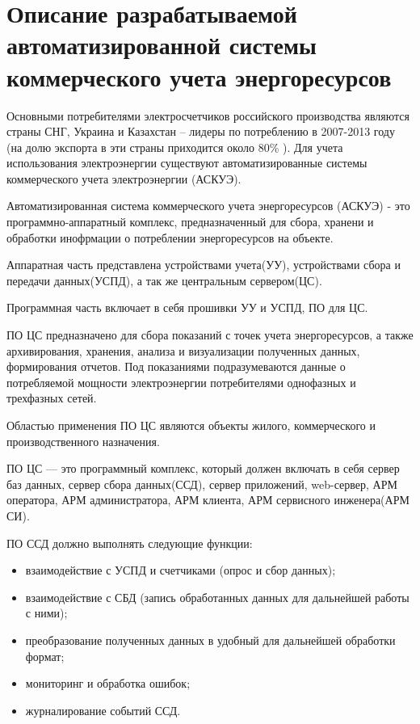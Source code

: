\newpage
\section{Описание разрабатываемой автоматизированной системы коммерческого учета энергоресурсов}
\setcounter{figure}{0}

Основными  потребителями  электросчетчиков российского производства являются страны СНГ, Украина и Казахстан – лидеры по потреблению в 2007-2013 году (на долю экспорта в эти страны приходится около  80\% \cite{rbk} ). Для учета использования электроэнергии существуют автоматизированные системы коммерческого учета электроэнергии (АСКУЭ).

Автоматизированная система коммерческого учета энергоресурсов (АСКУЭ) - это программно-аппаратный комплекс, предназначенный для сбора, хранени и обработки инофрмации о потреблении энергоресурсов на объекте. 

Аппаратная часть представлена устройствами учета(УУ), устройствами сбора и передачи данных(УСПД), а так же центральным сервером(ЦС).

Программная часть включает в себя прошивки УУ и УСПД, ПО для ЦС.

ПО ЦС предназначено для сбора показаний с точек учета энергоресурсов, а также архивирования, хранения, анализа и визуализации полученных данных, формирования отчетов. Под показаниями подразумеваются данные о потребляемой мощности электроэнергии потребителями однофазных и трехфазных сетей.

Областью применения ПО ЦС являются объекты жилого, коммерческого и производственного назначения.

ПО ЦС — это программный комплекс, который должен включать в себя сервер баз данных, сервер сбора данных(ССД), сервер приложений, web-сервер, АРМ оператора, АРМ администратора, АРМ клиента, АРМ сервисного инженера(АРМ СИ).

ПО ССД должно выполнять следующие функции:
\begin{itemize}
 \item взаимодействие с УСПД и счетчиками (опрос и сбор данных);
 \item взаимодействие с СБД (запись обработанных данных для дальнейшей работы с ними);
 \item преобразование полученных данных в удобный для дальнейшей обработки формат;
 \item мониторинг и обработка ошибок;
 \item журналирование событий ССД.
\end{itemize}

